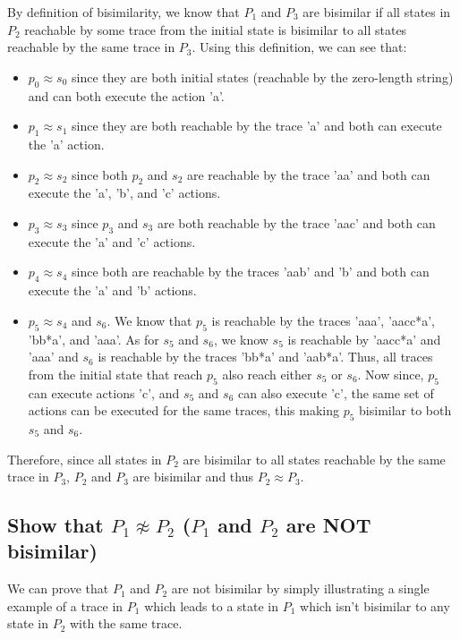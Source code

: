 \documentclass{article}[8pt]
\renewcommand{\thesubsection}{\thesection.\alph{subsection}}
\begin{document}
By definition of bisimilarity, we know that $P_1$ and $P_3$ are bisimilar if all states in $P_2$ reachable by some trace from the initial state is bisimilar to all states reachable by the same trace in $P_3$. Using this definition, we can see that:

\begin{itemize}
	\item $p_0 \approx s_0$ since they are both initial states (reachable by the zero-length string) and can both execute the action 'a'.
	\item $p_1 \approx s_1$ since they are both reachable by the trace 'a' and both can execute the 'a' action.
	\item $p_2 \approx s_2$ since both $p_2$ and $s_2$ are reachable by the trace 'aa' and both can execute the 'a', 'b', and 'c' actions.
	\item $p_3 \approx s_3$ since $p_3$ and $s_3$ are both reachable by the trace 'aac' and both can execute the 'a' and 'c' actions.
	\item $p_4 \approx s_4$ since both are reachable by the traces 'aab' and 'b' and both can execute the 'a' and 'b' actions.
	\item $p_5 \approx s_4$ and $s_6$. We know that $p_5$ is reachable by the traces 'aaa', 'aacc*a', 'bb*a', and 'aaa'. As for $s_5$ and $s_6$, we know $s_5$ is reachable by 'aacc*a' and 'aaa' and $s_6$ is reachable by the traces 'bb*a' and 'aab*a'. Thus, all traces from the initial state that reach $p_5$ also reach either $s_5$ or $s_6$. Now since, $p_5$ can execute actions 'c', and $s_5$ and $s_6$ can also execute 'c', the same set of actions can be executed for the same traces, this making $p_5$ bisimilar to both $s_5$ and $s_6$.
\end{itemize}

Therefore, since all states in $P_2$ are bisimilar to all states reachable by the same trace in $P_3$, $P_2$ and $P_3$ are bisimilar and thus $P_2 \approx P_3$.

\subsection[~\thesubsection]{Show that $P_1 \not\approx P_2$ ($P_1$ and $P_2$ are NOT bisimilar)}

We can prove that $P_1$ and $P_2$ are not bisimilar by simply illustrating a single example of a trace in $P_1$ which leads to a state in $P_1$ which isn't bisimilar to any state in $P_2$ with the same trace.
\end{document}
